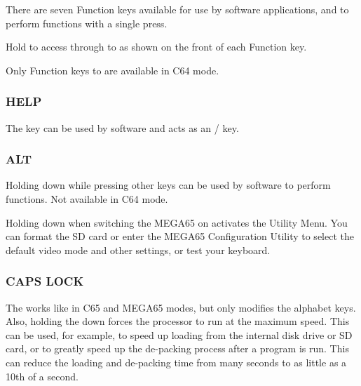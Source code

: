 There are seven Function keys available for use by software applications,       and  to perform functions with a single press.

Hold  to access  through to  as shown on the front of each Function key.

Only Function keys  to  are available in C64 mode.

\subsubsection{HELP}

The  key can be used by software and acts as an  /  key.

\subsubsection{ALT}

Holding  down while pressing other keys can be used by software to perform functions. Not available in C64 mode.

Holding  down when switching the MEGA65 on activates the Utility Menu. You can format the SD card or enter the MEGA65 Configuration Utility to select the default video mode and other settings, or test your keyboard.

\subsubsection{CAPS LOCK}

The  works like  in C65 and MEGA65 modes, but only modifies the alphabet keys.
Also, holding the  down forces the processor to run at the maximum speed. This can be used, for example,
to speed up loading from the internal disk drive or SD card, or to greatly speed up the de-packing process after a program is run.
This can reduce the loading and de-packing time from many seconds to as little as a 10th of a second.
